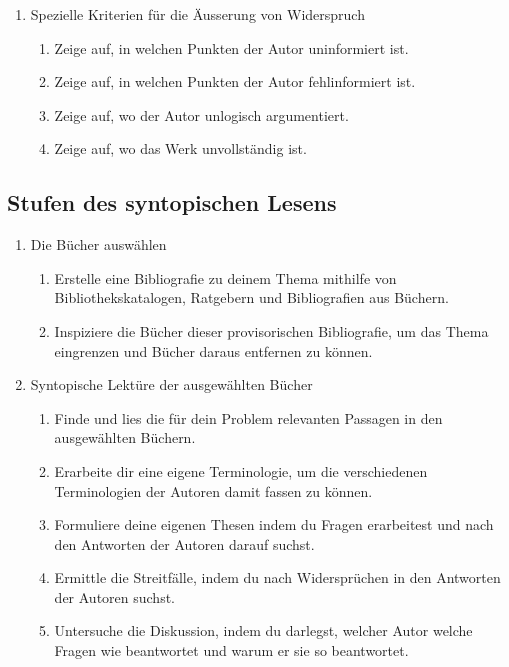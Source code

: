 \documentclass[a4paper,11pt]{scrartcl}
\begin{document}
\begin{itemize}
\begin{enumerate}
\begin{enumerate}
        \end{enumerate}
        \item Spezielle Kriterien für die Äusserung von Widerspruch
        \begin{enumerate}
            \item Zeige auf, in welchen Punkten der Autor uninformiert ist.
            \item Zeige auf, in welchen Punkten der Autor fehlinformiert ist.
            \item Zeige auf, wo der Autor unlogisch argumentiert.
            \item Zeige auf, wo das Werk unvollständig ist.
        \end{enumerate}
    \end{enumerate}
\end{itemize}

\subsection*{Stufen des syntopischen Lesens}

\begin{enumerate}
    \item Die Bücher auswählen
    \begin{enumerate}
        \item Erstelle eine Bibliografie zu deinem Thema mithilfe von Bibliothekskatalogen, Ratgebern und Bibliografien aus Büchern.
        \item Inspiziere die Bücher dieser provisorischen Bibliografie, um das Thema eingrenzen und Bücher daraus entfernen zu können.
    \end{enumerate}
    \item Syntopische Lektüre der ausgewählten Bücher
    \begin{enumerate}
        \item Finde und lies die für dein Problem relevanten Passagen in den ausgewählten Büchern.
        \item Erarbeite dir eine eigene Terminologie, um die verschiedenen Terminologien der Autoren damit fassen zu können.
        \item Formuliere deine eigenen Thesen indem du Fragen erarbeitest und nach den Antworten der Autoren darauf suchst.
        \item Ermittle die Streitfälle, indem du nach Widersprüchen in den Antworten der Autoren suchst.
        \item Untersuche die Diskussion, indem du darlegst, welcher Autor welche Fragen wie beantwortet und warum er sie so beantwortet.
    \end{enumerate}
\end{enumerate}



\end{document}
